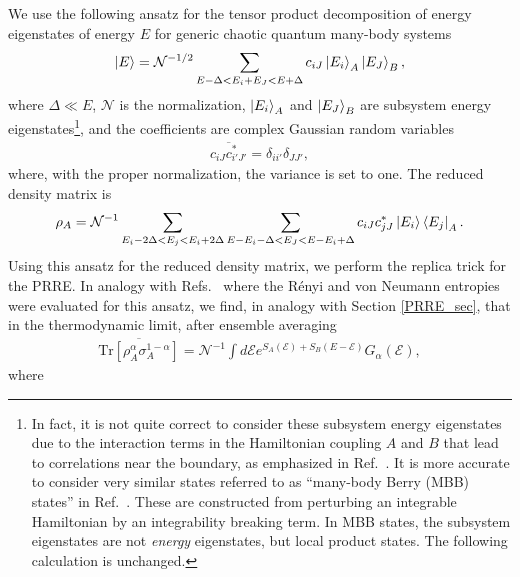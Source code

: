 \documentclass[a4paper,11pt]{article}
\newcommand{\Tr}{\text{Tr}}
\begin{document}
We use the following ansatz for the tensor product decomposition of energy eigenstates of energy $E$ for generic chaotic quantum many-body systems \cite{2010NJPh...12g5021D}
\begin{align}
    \ket{E} = \mathcal{N}^{-1/2}\sum_{E -\Delta < E_i + E_J <E +\Delta}c_{iJ}\ket{E_i}_A\ket{E_J}_B,
    \label{ketE_ansatz}
\end{align}
where $\Delta \ll E$, $\mathcal{N}$ is the normalization, $\ket{E_i}_A$ and $\ket{E_J}_B$ are subsystem energy eigenstates\footnote{In fact, it is not quite correct to consider these subsystem energy eigenstates due to the interaction terms in the Hamiltonian coupling $A$ and $B$ that lead to correlations near the boundary, as emphasized in Ref.~\cite{2017arXiv170908784L}. It is more accurate to consider very similar states referred to as ``many-body Berry (MBB) states'' in Ref.~\cite{2017arXiv170908784L}. These are constructed from perturbing an integrable Hamiltonian by an integrability breaking term. In MBB states, the subsystem eigenstates are not \textit{energy} eigenstates, but local product states. The following calculation is unchanged.}, and the coefficients are complex Gaussian random variables
\begin{align}
    \overline{c_{iJ}c^*_{i'J'}} = \delta_{ii'}\delta_{JJ'},
\end{align}
where, 
with the proper normalization,
the variance is set to one.
The reduced density matrix is
\begin{align}
    \rho_A = \mathcal{N}^{-1}\sum_{E_i -2\Delta < E_j <E_i +2\Delta}\sum_{E-E_i-\Delta<E_J<E-E_i+\Delta}c_{iJ}c^*_{jJ}\ket{E_i}\bra{E_j}_A.
\end{align}
Using this ansatz for the reduced density matrix, we perform the replica trick for the PRRE. In analogy with Refs.~\cite{2010NJPh...12g5021D,2017arXiv170908784L,2019PhRvE.100b2131M,2020JHEP...11..007D} where the  R\'enyi and von Neumann entropies were evaluated for this ansatz, we find, in analogy with Section \ref{PRRE_sec}, that in the thermodynamic limit, after ensemble averaging
\begin{align}
    \overline{\Tr \left[\rho_A^{\alpha}\sigma_A^{1-\alpha}\right]}= \mathcal{N}^{-1} \int d\mathcal{E}e^{S_A(\mathcal{E})+S_B(E-\mathcal{E})}G_{\alpha}(\mathcal{E}),
    \label{PRRE_int_cha}
\end{align}
where
\end{document}
